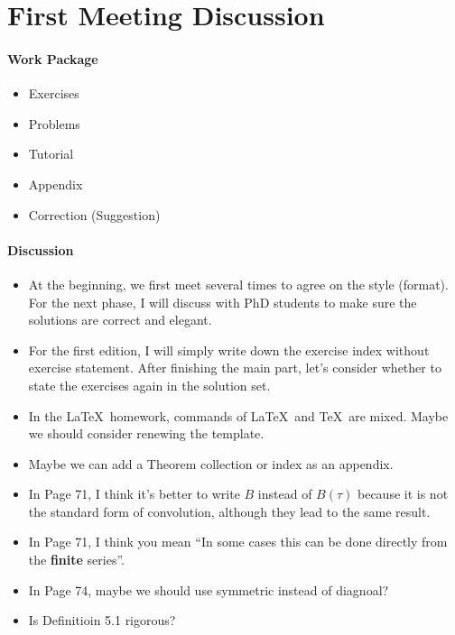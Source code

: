 \chapter{First Meeting Discussion}

\subsubsection{Work Package}
\begin{itemize}
\item Exercises
\item Problems
\item Tutorial
\item Appendix
\item Correction (Suggestion)
\end{itemize}

\subsubsection{Discussion}
\begin{itemize}
\item At the beginning, we first meet several times to agree on the style (format). For the next phase, I will discuss with PhD students to make sure the solutions are correct and elegant.
\item For the first edition, I will simply write down the exercise index without exercise statement. After finishing the main part, let's consider whether to state the exercises again in the solution set.
\item In the \LaTeX\ homework, commands of \LaTeX\ and \TeX\ are mixed. Maybe we should consider renewing the template.
\item Maybe we can add a Theorem collection or index as an appendix.
\item In Page 71, I think it's better to write $B$ instead of $B(\tau)$ because it is not the standard form of convolution, although they lead to the same result.
\item In Page 71, I think you mean ``In some cases this can be done directly from the \textbf{finite} series''.
\item In Page 74, maybe we should use symmetric instead of diagnoal?
\item Is Definitioin 5.1 rigorous?
\end{itemize}

